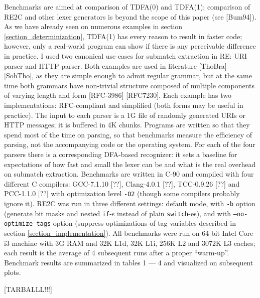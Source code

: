 \documentclass{article}
\theoremstyle{definition}
\begin{document}
\begin{multicols}{2}
Benchmarks are aimed at comparison of TDFA(0) and TDFA(1);
comparison of RE2C and other lexer generators is beyond the scope of this paper (see [Bum94]).
As we have already seen on numerous examples in section \ref{section_determinization},
TDFA(1) has every reason to result in faster code;
however, only a real-world program can show if there is any perceivable difference in practice.
I used two canonical use cases for submatch extraction in RE: URI parser and HTTP parser.
Both examples are used in literature [ThoBra] [SohTho],
as they are simple enough to admit regular grammar,
but at the same time both grammars have non-trivial structure composed of multiple components of varying length and form [RFC-3986] [RFC7230].
Each example has two implementations: RFC-compliant and simplified (both forms may be useful in practice).
The input to each parser is a 1G file of randomly generated URIs or HTTP messages; it is buffered in 4K chunks.
Programs are written so that they spend most of the time on parsing,
so that benchmarks measure the efficiency of parsing, not the accompanying code or the operating system.
For each of the four parsers there is a corresponding DFA-based recognizer:
it sets a baseline for expectations of how fast and small the lexer can be and what is the real overhead on submatch extraction.
Benchmarks are written in C-90 and compiled with four different C compilers:
GCC-7.1.10 [??],
Clang-4.0.1 [??],
TCC-0.9.26 [??]
and PCC-1.1.0 [??]
with optimization level \texttt{-O2} (though some compilers probably ignore it).
RE2C was run in three different settings:
default mode, with \texttt{-b} option (generate bit masks and nested \texttt{if}-s instead of plain \texttt{switch}-es),
and with \texttt{--no-optimize-tags} option (suppress optimizations of tag variables described in section \ref{section_implementation}).
All benchmarks were run on 64-bit Intel Core i3 machine with 3G RAM and 32K L1d, 32K L1i, 256K L2 and 3072K L3 caches;
each result is the average of 4 subsequent runs after a proper ``warm-up''.
Benchmark results are summarized in tables 1 --- 4
and visualized on subsequent plots.

[TARBALLL!!!]

\end{multicols}
\end{document}
